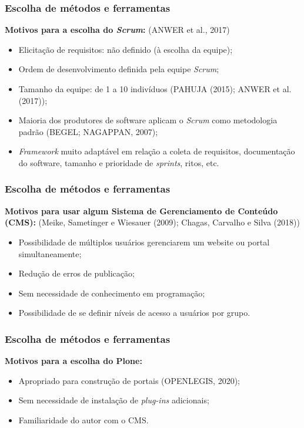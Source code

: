 \documentclass[xcolor=table]{beamer}
\begin{document}
\begin{frame}
 \frametitle{Escolha de métodos e ferramentas}
    \textbf{Motivos para a escolha do \textit{Scrum}:} (ANWER et al., 2017)
    \begin{itemize}
        \item Elicitação de requisitos: não definido (à escolha da equipe); %
        \item Ordem de desenvolvimento definida pela equipe \textit{Scrum}; %
        \item Tamanho da equipe: de 1 a 10 indivíduos (PAHUJA (2015); ANWER et al. (2017)); %
        \item Maioria dos produtores de software aplicam o \textit{Scrum} como metodologia padrão (BEGEL; NAGAPPAN, 2007);
        \item \textit{Framework} muito adaptável em relação a coleta de requisitos, documentação do software, tamanho e prioridade de \textit{sprints}, ritos, etc.  
    \end{itemize}
\end{frame}



\begin{frame}
    \frametitle{Escolha de métodos e ferramentas}
    \textbf{Motivos para usar algum Sistema de Gerenciamento de Conteúdo (CMS):} (Meike, Sametinger e Wiesauer (2009); Chagas, Carvalho e Silva (2018))
    \begin{itemize}
        \item Possibilidade de múltiplos usuários gerenciarem um website ou portal simultaneamente;
        \item Redução de erros de publicação; %
        \item Sem necessidade de conhecimento em programação; %
        \item Possibilidade de se definir níveis de acesso a usuários por grupo. %
    \end{itemize}
\end{frame}

\begin{frame}
    \frametitle{Escolha de métodos e ferramentas}
    \textbf{Motivos para a escolha do Plone:}
    \begin{itemize}
        \item Apropriado para construção de portais (OPENLEGIS, 2020); %
        \item Sem necessidade de instalação de \textit{plug-ins} adicionais; %
        \item Familiaridade do autor com o CMS.
    \end{itemize}
\end{frame}
\end{document}
